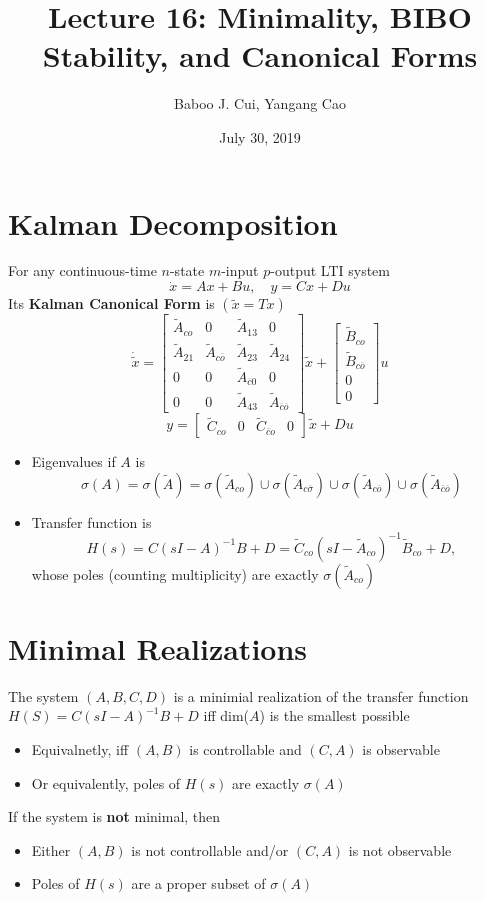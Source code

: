 \documentclass[10pt,a4paper,oneside]{article}
\date{July 30, 2019}
\author{Baboo J. Cui, Yangang Cao}
\title{Lecture 16: Minimality, BIBO Stability, and
	Canonical Forms}
\begin{document}
\maketitle
\tableofcontents
\newpage
\section{Kalman Decomposition}
For any continuous-time $n$-state $m$-input $p$-output LTI system
\[
\dot{x}=A x+B u, \quad y=C x+D u
\]
Its {\bfseries Kalman Canonical Form} is $(\tilde{x}=Tx)$
\[\dot{\tilde{x}}=\left[\begin{array}{cccc}{\tilde{A}_{co}} & {0} & {\tilde{A}_{13}} & {0} \\ {\tilde{A}_{21}} & {\tilde{A}_{c \overline{o}}} & {\tilde{A}_{23}} & {\tilde{A}_{24}} \\ {0} & {0} & {\tilde{A}_{\overline{c} 0}} & {0} \\ {0} & {0} & {\tilde{A}_{43}} & {\tilde{A}_{\overline{c} \overline{o}}}\end{array}\right]\tilde{x}+\left[\begin{array}{c}{\tilde{B}_{c o}} \\ {\tilde{B}_{c \overline{o}}} \\ {0} \\ {0}\end{array}\right]u\]
\[
y=\left[\begin{array}{cccc}
{\tilde{C}_{co}} & {0} & {\tilde{C}_{\overline{c}o}}&{0}\end{array}\right]\tilde{x}+Du
\]
\begin{itemize}
\item Eigenvalues if $A$ is
\[
\sigma(A)=\sigma(\tilde{A})=\sigma\left(\tilde{A}_{c o}\right) \cup \sigma\left(\tilde{A}_{c \overline{\sigma}}\right) \cup \sigma\left(\tilde{A}_{c \overline{o}}\right) \cup \sigma\left(\tilde{A}_{\overline{c} \overline{o}}\right)
\]
\item Transfer function is
\[
H(s)=C(sI-A)^{-1} B+D=\tilde{C}_{c o}\left(sI-\tilde{A}_{c o}\right)^{-1} \tilde{B}_{c o}+D,
\]
whose poles (counting multiplicity) are exactly $\sigma(\tilde{A}_{co})$
\end{itemize}
\section{Minimal Realizations}
The system $(A,B,C,D)$ is a minimial realization of the transfer function $H(S)=C(sI-A)^{-1} B+D$ iff dim($A$) is the smallest possible
\begin{itemize}
\item Equivalnetly, iff $(A,B)$ is controllable and $(C,A)$ is observable
\item Or equivalently, poles of $H(s)$ are exactly $\sigma(A)$
\end{itemize}
If the system is {\bfseries not} minimal, then
\begin{itemize}
\item Either $(A, B)$ is not controllable and/or $(C, A)$ is not observable
\item Poles of $H(s)$ are a proper subset of $\sigma(A)$
\end{itemize}
\end{document}
